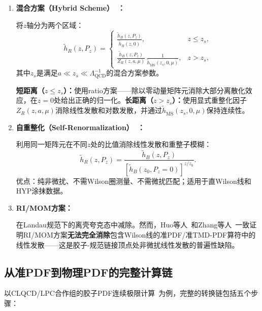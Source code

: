 \documentclass[12pt,a4paper]{ctexart}
\theoremstyle{definition}
\begin{document}
\begin{enumerate}[leftmargin=*]

\item \textbf{混合方案（Hybrid Scheme）~\cite{Ji2021hybrid}：}

将$z$轴分为两个区域：
\begin{equation}
\tilde h_R(z, P_z) = \begin{cases}
\displaystyle\frac{\tilde h_B(z, P_z)}{\tilde h_B(z, 0)}, & z \le z_s,\\[10pt]
\displaystyle\frac{\tilde h_B(z, P_z)}{Z_R(z, a, \mu)}\, \frac{1}{\tilde h_{\overline{\text{MS}}}(z_s, 0, \mu)}, & z > z_s,
\end{cases}
\label{eq:hybrid_scheme}
\end{equation}
其中$z_s$是满足$a \ll z_s \ll \Lambda_{\text{QCD}}^{-1}$的混合方案参数。

\textbf{短距离（$z\le z_s$）：}使用ratio方案——除以零动量矩阵元消除大部分离散化效应，在$z=0$处给出正确的归一化。\textbf{长距离（$z > z_s$）：}使用显式重整化因子$Z_R(z,a,\mu)$消除线性发散和对数发散，并通过$\tilde h_{\overline{\text{MS}}}(z_s,0,\mu)$保持连续性。

\item \textbf{自重整化（Self-Renormalization）~\cite{Huo2021self}：}

利用同一矩阵元在不同$z$处的比值消除线性发散和重整子模糊：
\begin{equation}
\tilde h_R(z, P_z) = \frac{\tilde h_B(z, P_z)}{[\tilde h_B(z_0, P_z=0)]^{z/z_0}}.
\label{eq:self_renorm}
\end{equation}
优点：纯非微扰、不需Wilson圈测量、不需微扰匹配；适用于直Wilson线和HYP涂抹数据。

\item \textbf{RI/MOM方案：}

在Landau规范下的离壳夸克态中减除。然而，Huo等人~\cite{Huo2021self}和Zhang等人~\cite{Zhang2022renormTMD}一致证明RI/MOM方案\textbf{无法完全消除}包含Wilson线的准PDF/准TMD-PDF算符中的线性发散——这是胶子-规范链接顶点处非微扰线性发散的普遍性缺陷。

\end{enumerate}

\subsection{从准PDF到物理PDF的完整计算链}

以CLQCD/LPC合作组的胶子PDF连续极限计算~\cite{Chen2025gluon}为例，完整的转换链包括五个步骤：
\end{document}
